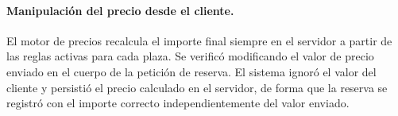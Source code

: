 \paragraph{Manipulación del precio desde el cliente.} El motor de precios recalcula el importe final siempre en el servidor a partir de las reglas activas para cada plaza. Se verificó modificando el valor de precio enviado en el cuerpo de la petición de reserva. El sistema ignoró el valor del cliente y persistió el precio calculado en el servidor, de forma que la reserva se registró con el importe correcto independientemente del valor enviado.
